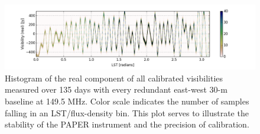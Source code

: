 \documentclass[twocolumn,numberedappendix]{emulateapj} \shorttitle{PSA64}
\begin{document}
\begin{figure}[!t]
\centering
\includegraphics[width=2.3\columnwidth]{plots/density.png}
\caption{Histogram of the real component of 
all calibrated visibilities measured over 135 days with every redundant east-west 30-m 
baseline at 149.5 MHz. 
Color scale indicates the number of samples falling in an LST/flux-density bin.
This plot serves to illustrate the stability of the PAPER instrument and the precision
of calibration.
}\label{fig:density}
\end{figure}
\end{document}
